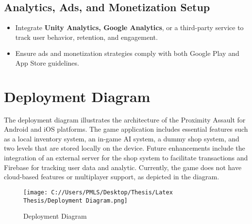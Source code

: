 	\subsection{Analytics, Ads, and Monetization Setup}
	\begin{itemize}
		\item {Integrate\textbf{ Unity Analytics, Google Analytics}, or a third-party service to track user behavior, retention, and engagement.}
		\item {Ensure ads and monetization strategies comply with both Google Play and App Store guidelines.}
	\end{itemize}

\section{Deployment Diagram}

The deployment diagram illustrates the architecture of the Proximity Assault for Android and iOS platforms. The game application includes essential features such as a local inventory system, an in-game AI system, a dummy shop system, and two levels that are stored locally on the device. Future enhancements include the integration of an external server for the shop system to facilitate transactions and Firebase for tracking user data and analytic. Currently, the game does not have cloud-based features or multiplayer support, as depicted in the diagram.\\
\begin{figure}[H]
	\centering
	\texttt{[image: C://Users/PMLS/Desktop/Thesis/Latex Thesis/Deployment Diagram.png]}
	\caption{Deployment Diagram}
	\label{fig:Deployement Diagram}
\end{figure}